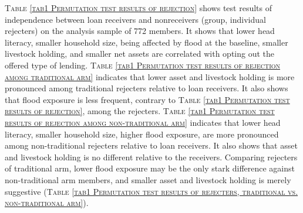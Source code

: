 
	\textsc{\normalsize Table \ref{tab1 Permutation test results of rejection}} shows test results of independence between loan receivers and nonreceivers (group, individual rejecters) on the analysis sample of 772 members. It shows that lower head literacy, smaller household size, being affected by flood at the baseline, smaller livestock holding, and smaller net assets are correlated with opting out the offered type of lending. \textsc{\normalsize Table \ref{tab1 Permutation test results of rejection among traditional arm}} indicates that lower asset and livestock holding is more pronounced among \textsf{traditional} rejecters relative to loan receivers. It also shows that flood exposure is less frequent, contrary to \textsc{\normalsize Table \ref{tab1 Permutation test results of rejection}}, among the rejecters. \textsc{\normalsize Table \ref{tab1 Permutation test results of rejection among non-traditional arm}} indicates that lower head literacy, smaller household size, higher flood exposure, are more pronounced among non-\textsf{traditional} rejecters relative to loan receivers. It also shows that asset and livestock holding is no different relative to the receivers. Comparing rejecters of \textsf{traditional} arm, lower flood exposure may be the only stark difference against non-\textsf{traditional} arm members, and smaller asset and livestock holding is merely suggestive (\textsc{\normalsize Table \ref{tab1 Permutation test results of rejecters, traditional vs. non-traditional arm}}). 
	
